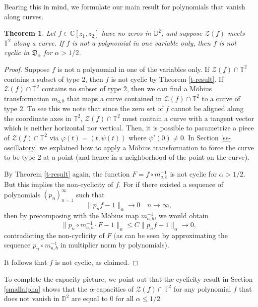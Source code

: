 \documentclass[11 pt,reqno]{amsart}
\newtheorem{thm}{Theorem}[section]
\theoremstyle{definition}
\theoremstyle{remark}
\numberwithin{equation}{section} \numberwithin{figure}{section}
\begin{document}
Bearing this in mind, we formulate our main result for polynomials that vanish along curves.
\begin{thm}\label{bigalphathm}
Let $f\in \mathbb{C}[z_1,z_2]$ have no zeros in $\mathbb{D}^2$, and suppose $\mathcal{Z}(f)$ meets $\mathbb{T}^2$ along a curve. If $f$ is not a polynomial in one variable only, then $f$ is not cyclic in
$\mathfrak{D}_{\alpha}$ for $\alpha>1/2$.
\end{thm}
\begin{proof}
  Suppose $f$ is not a polynomial in one of the variables only. If
  $\mathcal{Z}(f)\cap\mathbb{T}^2$ contains a subset of type $2$, then
  $f$ is not cyclic by Theorem \ref{t-result}. If ${\mathcal{Z}}(f)\cap {{\mathbb T}}^2$
  contains no subset of type $2$, then we can find a M\"obius
  transformation $m_{a,b}$ that maps a curve contained in
  $\mathcal{Z}(f)\cap\mathbb{T}^2$ to a curve of type $2$.  To see
  this we note that since the zero set of $f$ cannot be aligned along
  the coordinate axes in ${{\mathbb T}}^2$, ${\mathcal{Z}}(f)\cap {{\mathbb T}}^2$ must contain a
  curve with a tangent vector which is neither horizontal nor
  vertical.  Then, it is possible to parametrize a piece of
  ${\mathcal{Z}}(f)\cap {{\mathbb T}}^2$ via ${\varphi}(t) = (t,\psi(t))$ where $\psi'(0)\ne
  0$.  In Section \ref{ss-oscillatory} we explained how to
  apply a M\"obius transformation to force the curve to be type 2 at a
  point (and hence in a neighborhood of the point on the curve).

By Theorem \ref{t-result} again, the function $F=f\circ m_{a,b}^{-1}$ is not cyclic for $\alpha>1/2$.
But this implies the non-cyclicity of $f$. For if there existed a sequence of polynomials $(p_n)_{n=1}^{\infty}$ such that
\[\|p_nf-1\|_{\alpha} \to 0 \quad n\to \infty, \]
then by precomposing with the M\"obius map $m_{a,b}^{-1}$, we would obtain
\[\|p_{n}\circ m^{-1}_{a,b}\cdot F-1\|_{\alpha}\leq C \|p_nf-1\|_{\alpha}\to 0,\]
contradicting the non-cyclicity of $F$ (as can be seen by approximating the sequence $p_n\circ m_{a,b}^{-1}$ in multiplier norm by polynomials).

It follows that $f$ is not cyclic, as claimed.
\end{proof}
To complete the capacity picture, we point out that the cyclicity result in Section \ref{smallalpha} shows that the $\alpha$-capacities of
$\mathcal{Z}(f)\cap {{\mathbb T}}^2$ for any polynomial $f$ that does not 
vanish in $\mathbb{D}^2$ are equal to $0$ for all $\alpha\leq 1/2$.
\end{document}
